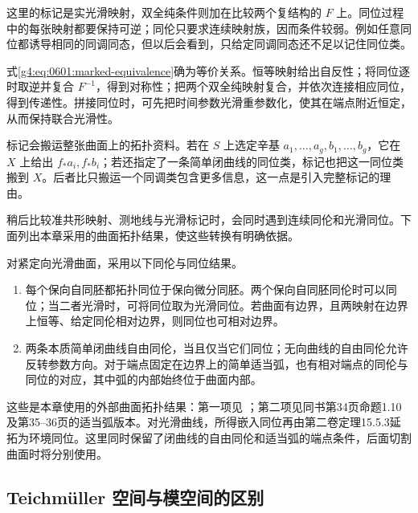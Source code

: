 这里的标记是实光滑映射，双全纯条件则加在比较两个复结构的 \(F\) 上。同位过程中的每张映射都要保持可逆；同伦只要求连续映射族，因而条件较弱。例如任意同位都诱导相同的同调同态，但以后会看到，只给定同调同态还不足以记住同位类。

\ProseParagraphBreak

式\eqref{g4:eq:0601:marked-equivalence}确为等价关系。恒等映射给出自反性；将同位逐时取逆并复合 \(F^{-1}\)，得到对称性；把两个双全纯映射复合，并依次连接相应同位，得到传递性。拼接同位时，可先把时间参数光滑重参数化，使其在端点附近恒定，从而保持联合光滑性。

\ProseParagraphBreak

标记会搬运整张曲面上的拓扑资料。若在 \(S\) 上选定辛基 \(a_1,\ldots,a_g,b_1,\ldots,b_g\)，它在 \(X\) 上给出 \(f_*a_i,f_*b_i\)；若还指定了一条简单闭曲线的同位类，标记也把这一同位类搬到 \(X\)。后者比只搬运一个同调类包含更多信息，这一点是引入完整标记的理由。

\ProseParagraphBreak

稍后比较准共形映射、测地线与光滑标记时，会同时遇到连续同伦和光滑同位。下面列出本章采用的曲面拓扑结果，使这些转换有明确依据。

\begin{proposition}\label{g4:prop:0601:surface-isotopy-interface}
	对紧定向光滑曲面，采用以下同伦与同位结果。
	\begin{enumerate}
		\item 每个保向自同胚都拓扑同位于保向微分同胚。两个保向自同胚同伦时可以同位；当二者光滑时，可将同位取为光滑同位。若曲面有边界，且两映射在边界上恒等、给定同伦相对边界，则同位也可相对边界。
		\item 两条本质简单闭曲线自由同伦，当且仅当它们同位；无向曲线的自由同伦允许反转参数方向。对于端点固定在边界上的简单适当弧，也有相对端点的同伦与同位的对应，其中弧的内部始终位于曲面内部。
	\end{enumerate}
\end{proposition}

这些是本章使用的外部曲面拓扑结果：第一项见 \cite[第1.4节，第41--42页，定理1.12、1.13及其后的光滑同位说明；第2.1节，第44--45页]{FarbMargalit2012Primer}；第二项见同书第34页命题1.10及第35--36页的适当弧版本。对光滑曲线，所得嵌入同位再由第二卷定理15.5.3延拓为环境同位。这里同时保留了闭曲线的自由同伦和适当弧的端点条件，后面切割曲面时将分别使用。

\subsection{Teichmüller 空间与模空间的区别}
\label{g4:subsec:0601:02}

